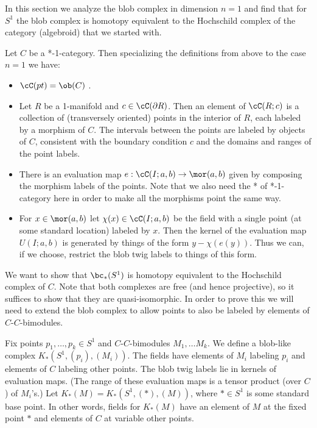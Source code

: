 
In this section we analyze the blob complex in dimension $n=1$
and find that for $S^1$ the blob complex is homotopy equivalent to the 
Hochschild complex of the category (algebroid) that we started with.

Let $C$ be a *-1-category.
Then specializing the definitions from above to the case $n=1$ we have:
\begin{itemize}
\item $\cC(pt) = \ob(C)$ .
\item Let $R$ be a 1-manifold and $c \in \cC(\bd R)$.
Then an element of $\cC(R; c)$ is a collection of (transversely oriented)
points in the interior
of $R$, each labeled by a morphism of $C$.
The intervals between the points are labeled by objects of $C$, consistent with
the boundary condition $c$ and the domains and ranges of the point labels.
\item There is an evaluation map $e: \cC(I; a, b) \to \mor(a, b)$ given by
composing the morphism labels of the points.
Note that we also need the * of *-1-category here in order to make all the morphisms point
the same way.
\item For $x \in \mor(a, b)$ let $\chi(x) \in \cC(I; a, b)$ be the field with a single
point (at some standard location) labeled by $x$.
Then the kernel of the evaluation map $U(I; a, b)$ is generated by things of the
form $y - \chi(e(y))$.
Thus we can, if we choose, restrict the blob twig labels to things of this form.
\end{itemize}

We want to show that $\bc_*(S^1)$ is homotopy equivalent to the
Hochschild complex of $C$.
Note that both complexes are free (and hence projective), so it suffices to show that they
are quasi-isomorphic.
In order to prove this we will need to extend the blob complex to allow points to also
be labeled by elements of $C$-$C$-bimodules.

Fix points $p_1, \ldots, p_k \in S^1$ and $C$-$C$-bimodules $M_1, \ldots M_k$.
We define a blob-like complex $K_*(S^1, (p_i), (M_i))$.
The fields have elements of $M_i$ labeling $p_i$ and elements of $C$ labeling
other points.
The blob twig labels lie in kernels of evaluation maps.
(The range of these evaluation maps is a tensor product (over $C$) of $M_i$'s.)
Let $K_*(M) = K_*(S^1, (*), (M))$, where $* \in S^1$ is some standard base point.
In other words, fields for $K_*(M)$ have an element of $M$ at the fixed point $*$
and elements of $C$ at variable other points.


